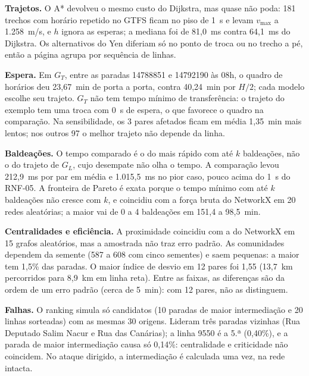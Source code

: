 \textbf{Trajetos.} O A* devolveu o mesmo custo do Dijkstra, mas quase não poda: 181 trechos com
horário repetido no GTFS ficam no piso de 1~s e levam $v_{\max}$ a 1.258~m/s, e $h$ ignora as
esperas; a mediana foi de 81,0~ms contra 64,1~ms do Dijkstra. Os alternativos do Yen diferiam
só no ponto de troca ou no trecho a pé, então a página agrupa por sequência de linhas.

\textbf{Espera.} Em $G_T$, entre as paradas 14788851 e 14792190 às 08h, o
quadro de horários deu 23,67~min de porta a porta, contra 40,24~min por $H/2$; cada modelo
escolhe seu trajeto. $G_T$ não tem tempo mínimo de transferência: o trajeto do exemplo tem uma troca
com 0~s de espera, o que favorece o quadro na comparação. Na sensibilidade, os 3 pares afetados
ficam em média 1,35~min mais lentos; nos outros 97 o melhor trajeto não depende da linha.

\textbf{Baldeações.} O tempo comparado é o do mais rápido com até $k$ baldeações, não o do
trajeto de $G_L$, cujo desempate não olha o tempo. A comparação levou 212,9~ms por par em média
e 1.015,5~ms no pior caso, pouco acima do 1~s do RNF-05. A fronteira de Pareto é exata porque o
tempo mínimo com até $k$ baldeações não cresce com $k$, e coincidiu com a força bruta do
NetworkX em 20 redes aleatórias; a maior vai de 0 a 4 baldeações em 151,4 a 98,5~min.

\textbf{Centralidades e eficiência.} A proximidade coincidiu com a do NetworkX em 15 grafos
aleatórios, mas a amostrada não traz erro padrão. As comunidades dependem da semente (587 a 608
com cinco sementes) e saem pequenas: a maior tem 1,5\% das paradas. O maior índice de desvio em
12 pares foi 1,55 (13,7~km percorridos para 8,9~km em linha reta). Entre as faixas, as
diferenças são da ordem de um erro padrão (cerca de 5~min): com 12 pares, não as distinguem.

\textbf{Falhas.} O ranking simula só candidatos (10 paradas de maior intermediação e 20 linhas
sorteadas) com as mesmas 30 origens. Lideram três paradas vizinhas (Rua Deputado Salim Nacur e
Rua das Canárias); a linha 9550 é a 5.ª (0,40\%), e a parada de maior intermediação causa só
0,14\%: centralidade e criticidade não coincidem. No ataque dirigido, a intermediação é calculada
uma vez, na rede intacta.
